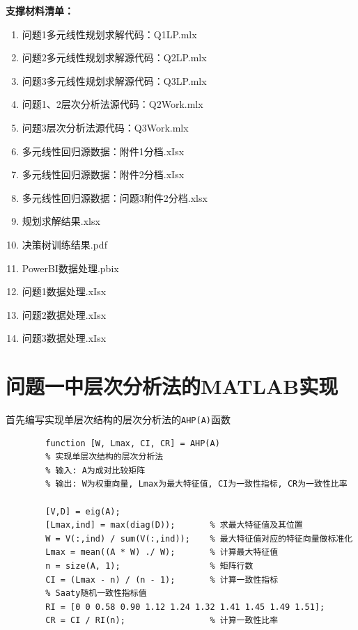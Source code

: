\ifx\allfiles\undefined


\else
\fi

\appendix
\renewcommand{\appendixpagename}{附录}
\renewcommand{\appendixtocname}{附录}
\begin{appendices}

\noindent \textbf{{\large 支撑材料清单：}}
\begin{enumerate}[(1)]
	\item 问题1多元线性规划求解代码：Q1LP.mlx 
	\item 问题2多元线性规划求解源代码：Q2LP.mlx 
	\item 问题3多元线性规划求解源代码：Q3LP.mlx 
	\item 问题1、2层次分析法源代码：Q2Work.mlx 
	\item 问题3层次分析法源代码：Q3Work.mlx
	\item 多元线性回归源数据：附件1分档.xIsx
	\item 多元线性回归源数据：附件2分档.xIsx
	\item 多元线性回归源数据：问题3附件2分档.xlsx
	\item 规划求解结果.xlsx
	\item 决策树训练结果.pdf
	\item PowerBI数据处理.pbix
	\item 问题1数据处理.xIsx
	\item 问题2数据处理.xIsx
	\item 问题3数据处理.xIsx
\end{enumerate}

	\section{问题一中层次分析法的MATLAB实现}

	首先编写实现单层次结构的层次分析法的\verb|AHP(A)|函数
	\begin{tcolorbox}[breakable]
		\begin{verbatim}
		function [W, Lmax, CI, CR] = AHP(A)
		% 实现单层次结构的层次分析法
		% 输入: A为成对比较矩阵
		% 输出: W为权重向量, Lmax为最大特征值, CI为一致性指标, CR为一致性比率
		
		[V,D] = eig(A);
		[Lmax,ind] = max(diag(D));       % 求最大特征值及其位置
		W = V(:,ind) / sum(V(:,ind));    % 最大特征值对应的特征向量做标准化
		Lmax = mean((A * W) ./ W);       % 计算最大特征值
		n = size(A, 1);                  % 矩阵行数
		CI = (Lmax - n) / (n - 1);       % 计算一致性指标
		% Saaty随机一致性指标值
		RI = [0 0 0.58 0.90 1.12 1.24 1.32 1.41 1.45 1.49 1.51]; 
		CR = CI / RI(n);                 % 计算一致性比率
	 \end{verbatim}
	\end{tcolorbox}


\end{appendices}
